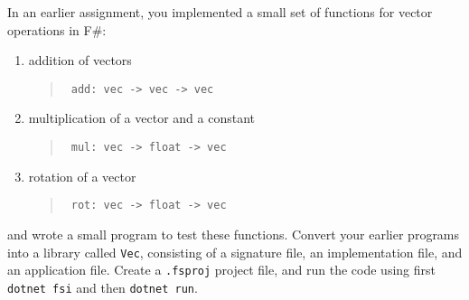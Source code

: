 In an earlier assignment, you implemented a small set of functions for vector operations in F\#:
\begin{enumerate}
\item addition of vectors
  \begin{quote}
    \mbox{\lstinline! add: vec -> vec -> vec!}
  \end{quote}
\item multiplication of a vector and a constant
  \begin{quote}
    \mbox{\lstinline! mul: vec -> float -> vec!}
  \end{quote}
\item rotation of a vector
  \begin{quote}
    \mbox{\lstinline! rot: vec -> float -> vec!}
  \end{quote}
\end{enumerate}
and wrote a small program to test these functions. Convert your earlier programs into a library called \lstinline{Vec}, consisting of a signature file, an implementation file, and an application file. Create a
\lstinline[language=console]{.fsproj} project file, and run the code using first \lstinline[language=console]{dotnet fsi} and then  \lstinline[language=console]{dotnet run}. 
